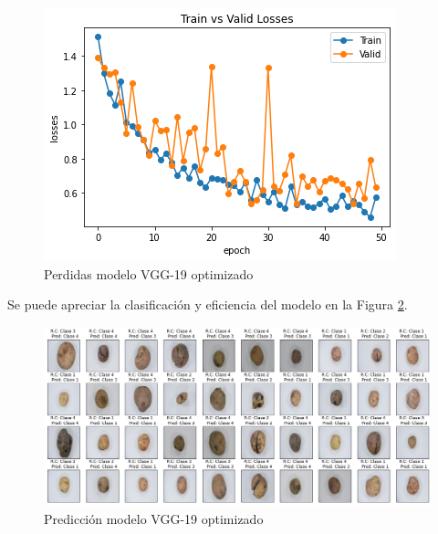 		\newpage
		\begin{figure}[ht]
			\centering
			\includegraphics[scale=0.6]{Figs/505.png}
			\caption{Perdidas modelo VGG-19 optimizado}
			\label{fig:perdda_vgg19_opt}
		\end{figure}
	
	Se puede apreciar la clasificación y eficiencia del modelo en la Figura \ref{fig:pre_vgg19_opt}.
	
		\begin{figure}[ht]
			\centering
			\includegraphics[scale=0.4]{Figs/506.png}
			\caption{Predicción modelo VGG-19 optimizado}
			\label{fig:pre_vgg19_opt}
		\end{figure}
	
